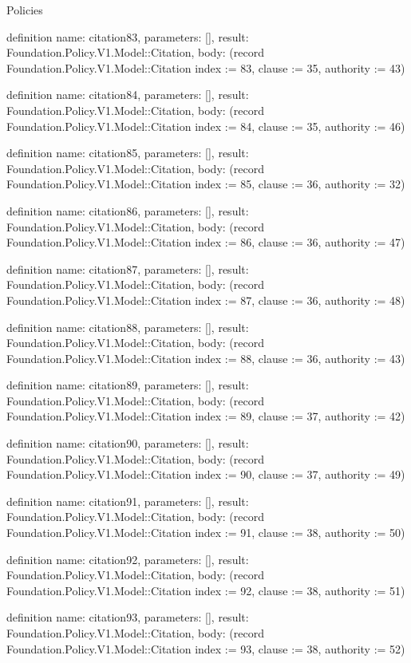 \begin{lexlean}{Policies}
\begin{semanticmodule}
definition{
  name: citation83,
  parameters: [],
  result: Foundation.Policy.V1.Model::Citation,
  body: (record Foundation.Policy.V1.Model::Citation {index := 83, clause := 35, authority := 43})
}

definition{
  name: citation84,
  parameters: [],
  result: Foundation.Policy.V1.Model::Citation,
  body: (record Foundation.Policy.V1.Model::Citation {index := 84, clause := 35, authority := 46})
}

definition{
  name: citation85,
  parameters: [],
  result: Foundation.Policy.V1.Model::Citation,
  body: (record Foundation.Policy.V1.Model::Citation {index := 85, clause := 36, authority := 32})
}

definition{
  name: citation86,
  parameters: [],
  result: Foundation.Policy.V1.Model::Citation,
  body: (record Foundation.Policy.V1.Model::Citation {index := 86, clause := 36, authority := 47})
}

definition{
  name: citation87,
  parameters: [],
  result: Foundation.Policy.V1.Model::Citation,
  body: (record Foundation.Policy.V1.Model::Citation {index := 87, clause := 36, authority := 48})
}

definition{
  name: citation88,
  parameters: [],
  result: Foundation.Policy.V1.Model::Citation,
  body: (record Foundation.Policy.V1.Model::Citation {index := 88, clause := 36, authority := 43})
}

definition{
  name: citation89,
  parameters: [],
  result: Foundation.Policy.V1.Model::Citation,
  body: (record Foundation.Policy.V1.Model::Citation {index := 89, clause := 37, authority := 42})
}

definition{
  name: citation90,
  parameters: [],
  result: Foundation.Policy.V1.Model::Citation,
  body: (record Foundation.Policy.V1.Model::Citation {index := 90, clause := 37, authority := 49})
}

definition{
  name: citation91,
  parameters: [],
  result: Foundation.Policy.V1.Model::Citation,
  body: (record Foundation.Policy.V1.Model::Citation {index := 91, clause := 38, authority := 50})
}

definition{
  name: citation92,
  parameters: [],
  result: Foundation.Policy.V1.Model::Citation,
  body: (record Foundation.Policy.V1.Model::Citation {index := 92, clause := 38, authority := 51})
}

definition{
  name: citation93,
  parameters: [],
  result: Foundation.Policy.V1.Model::Citation,
  body: (record Foundation.Policy.V1.Model::Citation {index := 93, clause := 38, authority := 52})
}


\end{semanticmodule}
\end{lexlean}

